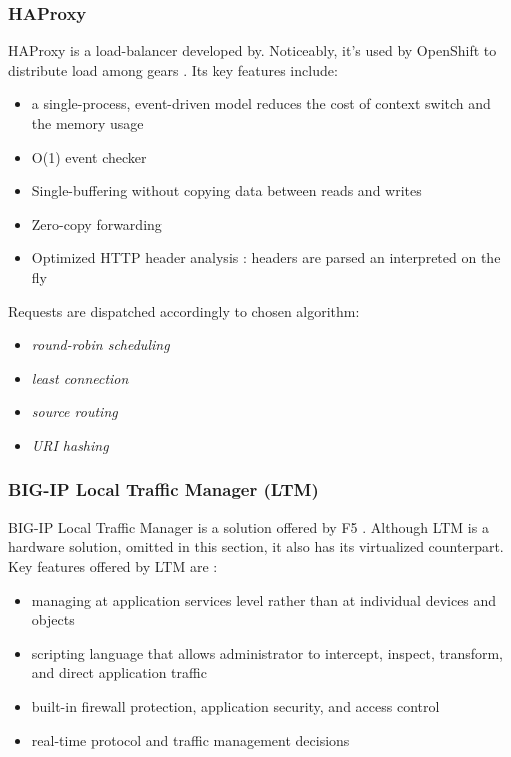 \subsubsection*{HAProxy}

HAProxy \cite{HAProxy} is a load-balancer developed by. Noticeably, it's used by OpenShift \cite{OpenShift} to distribute load among gears \cite{OpenShiftScaling}. Its key features include:
\begin{itemize}
	\item a single-process, event-driven model reduces the cost of context switch and the memory usage
	\item O(1) event checker
	\item Single-buffering without copying data between reads and writes
	\item Zero-copy forwarding
	\item Optimized HTTP header analysis : headers are parsed an interpreted on the fly
\end{itemize}

Requests are dispatched accordingly to chosen algorithm:
\begin{itemize}
  \item \textit{round-robin scheduling}
  \item \textit{least connection}
  \item \textit{source routing}
  \item \textit{URI hashing}
\end{itemize}

\subsubsection*{BIG-IP Local Traffic Manager (LTM)}
BIG-IP Local Traffic Manager is a solution offered by F5 \cite{F5}. Although LTM is a hardware solution, omitted in this section, it also has its virtualized counterpart. Key features offered by LTM are \cite{LTM}:
\begin{itemize}
  \item managing at application services level rather than at individual devices and objects
  \item scripting language that allows administrator to intercept, inspect, transform, and direct application traffic
  \item built-in firewall protection, application security, and access control
  \item real-time protocol and traffic management decisions
\end{itemize}

